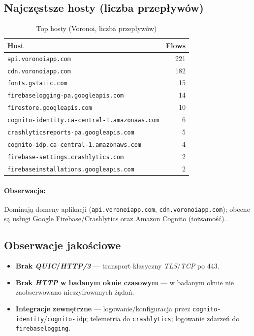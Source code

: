 \subsection{Najczęstsze hosty (liczba przepływów)}
\begin{table}[H]
  \centering
  \caption{Top hosty (Voronoi, liczba przepływów)}
  \label{tab:voronoi-hosts}
  \begin{tabular}{lr}
    \toprule
    \textbf{Host} & \textbf{Flows} \\
    \midrule
    \texttt{api.voronoiapp.com} & 221 \\
    \texttt{cdn.voronoiapp.com} & 182 \\
    \texttt{fonts.gstatic.com} & 15 \\
    \texttt{firebaselogging-pa.googleapis.com} & 14 \\
    \texttt{firestore.googleapis.com} & 10 \\
    \texttt{cognito-identity.ca-central-1.amazonaws.com} & 6 \\
    \texttt{crashlyticsreports-pa.googleapis.com} & 5 \\
    \texttt{cognito-idp.ca-central-1.amazonaws.com} & 4 \\
    \texttt{firebase-settings.crashlytics.com} & 2 \\
    \texttt{firebaseinstallations.googleapis.com} & 2 \\
    \bottomrule
  \end{tabular}
\end{table}

\paragraph{Obserwacja:}
Dominują domeny aplikacji (\texttt{api.voronoiapp.com}, \texttt{cdn.voronoiapp.com}); obecne są usługi Google Firebase/Crashlytics oraz Amazon Cognito (tożsamość).

\subsection{Obserwacje jakościowe}
\begin{itemize}
  \item \textbf{Brak \emph{QUIC}/\emph{HTTP/3}} — transport klasyczny \emph{TLS}/\emph{TCP} po 443.
  \item \textbf{Brak \emph{HTTP} w badanym oknie czasowym} — w badanym oknie nie zaobserwowano nieszyfrowanych żądań.
  \item \textbf{Integracje zewnętrzne} — logowanie/konfiguracja przez \texttt{cognito-identity}/\texttt{cognito-idp}; telemetria do \texttt{crashlytics}; logowanie zdarzeń do \texttt{firebaselogging}.
\end{itemize}


